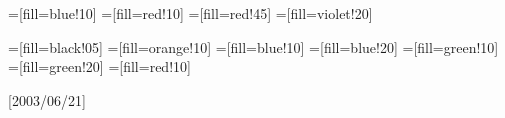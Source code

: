 \usepackage[utf8]{inputenc}
\usepackage[T1]{fontenc}

\usepackage[normalem]{ulem}  %
\usepackage{soul}
\usepackage{import}                      %
\usepackage{etex}
\usepackage{graphics}
\graphicspath{{./figures/}}                %
\usepackage{psfrag}
\usepackage{cancel}
\usepackage{MnSymbol}    %

\usepackage{xcolor}


\usepackage{amsmath}

\usepackage[dvipsnames]{colortbl}
\def\grayscale{0.8}                              %
\newcommand{\gcell}{\cellcolor[gray]{\grayscale}}   %

\def\scalefactor{0.6}                     %
\usepackage{tikz}
\usepackage{tikz-qtree}                   %
\usetikzlibrary{matrix,arrows}  %
\usetikzlibrary{chains,fit,shapes}
\usetikzlibrary{arrows,automata}
\usetikzlibrary{graphs}


\usepackage{cancel}

\usetikzlibrary{arrows, decorations.markings}


=[fill=blue!10]
=[fill=red!10]
=[fill=red!45]
=[fill=violet!20]

=[fill=black!05]
=[fill=orange!10]
=[fill=blue!10]
=[fill=blue!20]
=[fill=green!10]
=[fill=green!20]
=[fill=red!10]

\usepackage{listings}[2003/06/21] %

\iffalse
\lstloadaspects{keywordcomments}  %
\usepackage{lstassem}
\usepackage{lsttiny}
\usepackage{lsttac}
\usepackage{lstpcode}
\usepackage{lstasurmcode}   %
\usepackage{lstrmcode}      %
\usepackage{lstpseudo}
\lstset{mathescape=true}
\lstset{language=pseudo} 
\lstset{basicstyle=\scriptsize}
\lstset{frame=trBL}

\lstset{numberstyle=\tiny,numberfirstline=true,stepnumber=1,numbers=left}
\lstset{emphstyle={\bfseries\textcolor{beamerblue}}}
\lstset{emphstyle=[2]{\bfseries\textcolor{beamerred}}}
\fi

